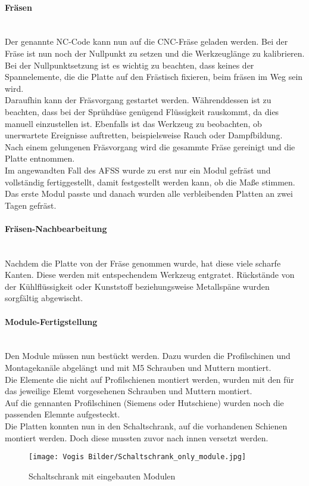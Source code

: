     \paragraph{Fräsen}\mbox{}\\
    Der genannte NC-Code kann nun auf die CNC-Fräse geladen werden. Bei der Fräse ist nun noch der Nullpunkt zu setzen und die Werkzeuglänge zu kalibrieren. Bei der Nullpunktsetzung ist es wichtig zu beachten, dass keines der Spannelemente, die die Platte auf den Frästisch fixieren, beim fräsen im Weg sein wird.\\
    Daraufhin kann der Fräsvorgang gestartet werden. Währenddessen ist zu beachten, dass bei der Sprühdüse genügend Flüssigkeit rauskommt, da dies manuell einzustellen ist. Ebenfalls ist das Werkzeug zu beobachten, ob unerwartete Ereignisse auftretten, beispielsweise Rauch oder Dampfbildung.\\ 
    Nach einem gelungenen Fräsvorgang wird die gesammte Fräse gereinigt und die Platte entnommen.\\
    Im angewandten Fall des AFSS wurde zu erst nur ein Modul gefräst und vollständig fertiggestellt, damit festgestellt werden kann, ob die Maße stimmen. Das erste Modul passte und danach wurden alle verbleibenden Platten an zwei Tagen gefräst.

    \paragraph{Fräsen-Nachbearbeitung}\mbox{}\\
    Nachdem die Platte von der Fräse genommen wurde, hat diese viele scharfe Kanten. Diese werden mit entspechendem Werkzeug entgratet. Rückstände von der Kühlflüssigkeit oder Kunststoff beziehungsweise Metallspäne wurden sorgfältig abgewischt.
    \paragraph{Module-Fertigstellung}\mbox{}\\
    Den Module müssen nun bestückt werden. Dazu wurden die Profilschinen und Montagekanäle abgelängt und mit M5 Schrauben und Muttern montiert.\\
    Die Elemente die nicht auf Profilschienen montiert werden, wurden mit den für das jeweilige Elemt vorgesehenen Schrauben und Muttern montiert.\\
    Auf die gennanten Profilschinen (Siemens oder Hutschiene) wurden noch die passenden Elemnte aufgesteckt.\\
    Die Platten konnten nun in den Schaltschrank, auf die vorhandenen Schienen montiert werden. Doch diese mussten zuvor nach innen versetzt werden. 
    \begin{figure}[h]
        \centering
        \texttt{[image: Vogis Bilder/Schaltschrank\_only\_module.jpg]}
        \caption{Schaltschrank mit eingebauten Modulen}
        \label{fig:Schaltschrank_onlyModule}
    \end{figure}    
